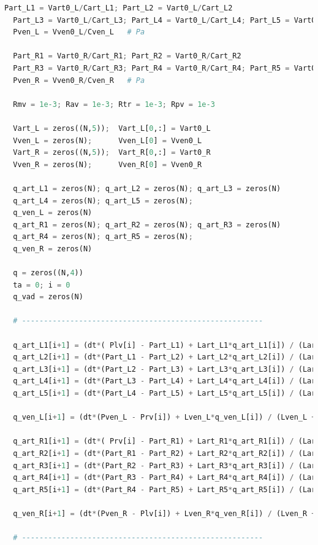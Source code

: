 \begin{lstlisting}[language=Python,caption={Математическая модель сердечно-сосудистой системы на языке программирования Python},label={list:cardiovascular_system_model}]
  Part_L1 = Vart0_L/Cart_L1; Part_L2 = Vart0_L/Cart_L2
  Part_L3 = Vart0_L/Cart_L3; Part_L4 = Vart0_L/Cart_L4; Part_L5 = Vart0_L/Cart_L5
  Pven_L = Vven0_L/Cven_L   # Pa

  Part_R1 = Vart0_R/Cart_R1; Part_R2 = Vart0_R/Cart_R2
  Part_R3 = Vart0_R/Cart_R3; Part_R4 = Vart0_R/Cart_R4; Part_R5 = Vart0_R/Cart_R5
  Pven_R = Vven0_R/Cven_R   # Pa

  Rmv = 1e-3; Rav = 1e-3; Rtr = 1e-3; Rpv = 1e-3

  Vart_L = zeros((N,5));  Vart_L[0,:] = Vart0_L
  Vven_L = zeros(N);      Vven_L[0] = Vven0_L
  Vart_R = zeros((N,5));  Vart_R[0,:] = Vart0_R
  Vven_R = zeros(N);      Vven_R[0] = Vven0_R

  q_art_L1 = zeros(N); q_art_L2 = zeros(N); q_art_L3 = zeros(N)
  q_art_L4 = zeros(N); q_art_L5 = zeros(N); 
  q_ven_L = zeros(N)
  q_art_R1 = zeros(N); q_art_R2 = zeros(N); q_art_R3 = zeros(N)
  q_art_R4 = zeros(N); q_art_R5 = zeros(N); 
  q_ven_R = zeros(N)

  q = zeros((N,4))
  ta = 0; i = 0
  q_vad = zeros(N)

  # -------------------------------------------------------

  q_art_L1[i+1] = (dt*( Plv[i] - Part_L1) + Lart_L1*q_art_L1[i]) / (Lart_L1 + dt*(Rart_L1 + Rav)) 
  q_art_L2[i+1] = (dt*(Part_L1 - Part_L2) + Lart_L2*q_art_L2[i]) / (Lart_L2 + dt*Rart_L2) 
  q_art_L3[i+1] = (dt*(Part_L2 - Part_L3) + Lart_L3*q_art_L3[i]) / (Lart_L3 + dt*Rart_L3) 
  q_art_L4[i+1] = (dt*(Part_L3 - Part_L4) + Lart_L4*q_art_L4[i]) / (Lart_L4 + dt*Rart_L4) 
  q_art_L5[i+1] = (dt*(Part_L4 - Part_L5) + Lart_L5*q_art_L5[i]) / (Lart_L5 + dt*Rart_L5) 

  q_ven_L[i+1] = (dt*(Pven_L - Prv[i]) + Lven_L*q_ven_L[i]) / (Lven_L + dt*(Rven_L + Rtr))

  q_art_R1[i+1] = (dt*( Prv[i] - Part_R1) + Lart_R1*q_art_R1[i]) / (Lart_R1 + dt*(Rart_R1 + Rpv)) 
  q_art_R2[i+1] = (dt*(Part_R1 - Part_R2) + Lart_R2*q_art_R2[i]) / (Lart_R2 + dt*Rart_R2) 
  q_art_R3[i+1] = (dt*(Part_R2 - Part_R3) + Lart_R3*q_art_R3[i]) / (Lart_R3 + dt*Rart_R3) 
  q_art_R4[i+1] = (dt*(Part_R3 - Part_R4) + Lart_R4*q_art_R4[i]) / (Lart_R4 + dt*Rart_R4) 
  q_art_R5[i+1] = (dt*(Part_R4 - Part_R5) + Lart_R5*q_art_R5[i]) / (Lart_R5 + dt*Rart_R5) 

  q_ven_R[i+1] = (dt*(Pven_R - Plv[i]) + Lven_R*q_ven_R[i]) / (Lven_R + dt*(Rven_R + Rmv))

  # -------------------------------------------------------


\end{lstlisting}
